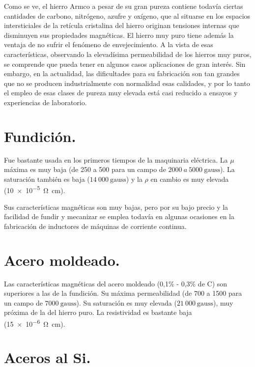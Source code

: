 \documentclass[12pt,a4paper]{article}
\begin{document}
Como se ve, el hierro Armco a pesar de su gran pureza contiene todavía ciertas cantidades de carbono, nitrógeno, azufre y oxígeno, que al situarse en los espacios intersticiales de la retícula cristalina del hierro originan tensiones internas que disminuyen sus propiedades magnéticas. El hierro muy puro tiene además la ventaja de no sufrir el fenómeno de envejecimiento. A la vista de esas características, observando la elevadísima permeabilidad de los hierros muy puros, se comprende que pueda tener en algunos casos aplicaciones de gran interés. Sin embargo, en la actualidad, las dificultades para su fabricación son tan grandes que no se producen industrialmente con normalidad esas calidades, y por lo tanto el empleo de esas clases de pureza muy elevada está casi reducido a ensayos y experiencias de laboratorio.

\section{Fundición.}

Fue bastante usada en los primeros tiempos de la maquinaria eléctrica. La $\mu$ máxima es muy baja (de 250 a 500 para un campo de $2000\ a\ 5000\ \mathrm{gauss}$). La saturación también es baja ($14\ 000\ \mathrm{gauss}$) y la $\rho$ en cambio es muy elevada (\SI{10e-5}{\ohm\centi\metre}). 

Sus características magnéticas son muy bajas, pero por su bajo precio y la facilidad de fundir y mecanizar se emplea todavía en algunas ocasiones en la fabricación de inductores de máquinas de corriente continua.

\section{Acero moldeado.}

Las características magnéticas del acero moldeado (0,1\% - 0,3\% de C) son superiores a las de la fundición. Su máxima permeabilidad (de 700 a 1500  para un campo de $7000\ \mathrm{gauss}$). Su saturación es muy elevada ($21\ 000\ \mathrm{gauss}$), muy próxima de la del hierro puro. La resistividad es bastante baja (\SI{15e-6}{\ohm\centi\metre}).

\section{Aceros al Si.}
\end{document}
